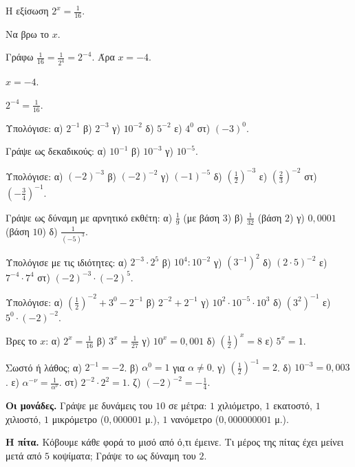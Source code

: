 \tixero Η εξίσωση $2^x=\frac{1}{16}$.\par
\tithelo Να βρω το $x$.\par
\possindeo Γράφω $\frac{1}{16}=\frac{1}{2^4}=2^{-4}$. Άρα $x=-4$.\par
\apantisi $x=-4$.\par
\elegxos $2^{-4}=\frac{1}{16}$.



\ex Υπολόγισε: α) $2^{-1}$ \quad β) $2^{-3}$ \quad γ) $10^{-2}$ \quad δ) $5^{-2}$ \quad ε) $4^0$ \quad στ) $(-3)^0$.

\ex Γράψε ως δεκαδικούς: α) $10^{-1}$ \quad β) $10^{-3}$ \quad γ) $10^{-5}$.

\ex Υπολόγισε: α) $(-2)^{-3}$ \quad β) $(-2)^{-2}$ \quad γ) $(-1)^{-5}$ \quad δ) $\left(\frac{1}{2}\right)^{-3}$ \quad ε) $\left(\frac{2}{3}\right)^{-2}$ \quad στ) $\left(-\frac{3}{4}\right)^{-1}$.

\ex Γράψε ως δύναμη με αρνητικό εκθέτη: α) $\frac{1}{9}$ (με βάση $3$) \quad β) $\frac{1}{32}$ (βάση $2$) \quad γ) $0{,}0001$ (βάση $10$) \quad δ) $\frac{1}{(-5)^3}$.

\ex Υπολόγισε με τις ιδιότητες: α) $2^{-3}\cdot2^5$ \quad β) $10^4:10^{-2}$ \quad γ) $(3^{-1})^2$ \quad δ) $(2\cdot5)^{-2}$ \quad ε) $7^{-4}\cdot7^4$ \quad στ) $(-2)^{-3}\cdot(-2)^5$.

\ex Υπολόγισε: α) $\left(\frac{1}{2}\right)^{-2}+3^0-2^{-1}$ \quad β) $2^{-2}+2^{-1}$ \quad γ) $10^2\cdot10^{-5}\cdot10^3$ \quad δ) $(3^2)^{-1}$ \quad ε) $5^0\cdot(-2)^{-2}$.

\ex Βρες το $x$: α) $2^x=\frac{1}{16}$ \quad β) $3^x=\frac{1}{27}$ \quad γ) $10^x=0{,}001$ \quad δ) $\left(\frac{1}{2}\right)^x=8$ \quad ε) $5^x=1$.

\ex Σωστό ή λάθος; α) $2^{-1}=-2$. \quad β) $\alpha^0=1$ για $\alpha\neq0$. \quad γ) $\left(\frac{1}{2}\right)^{-1}=2$. \quad δ) $10^{-3}=0{,}003$. \quad ε) $\alpha^{-\nu}=\frac{1}{\alpha^\nu}$. \quad στ) $2^{-2}\cdot2^2=1$. \quad ζ) $(-2)^{-2}=-\frac{1}{4}$.


\ex \textbf{Οι μονάδες.} Γράψε με δυνάμεις του $10$ σε μέτρα: $1$ χιλιόμετρο, $1$ εκατοστό, $1$ χιλιοστό, $1$ μικρόμετρο ($0{,}000001$ μ.), $1$ νανόμετρο ($0{,}000000001$ μ.).

\ex \textbf{Η πίτα.} Κόβουμε κάθε φορά το μισό από ό,τι έμεινε. Τι μέρος της πίτας έχει μείνει μετά από $5$ κοψίματα; Γράψε το ως δύναμη του $2$.

